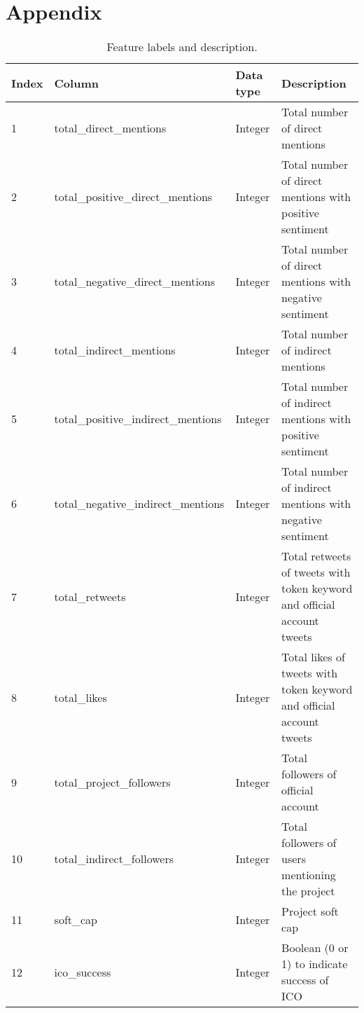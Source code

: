 \documentclass[runningheads]{llncs}
\begin{document}
\section{Appendix}
\begin{table*}[htbp]
\caption{Feature labels and description.}
\begin{center}
\begin{tabular}{|p{10mm}|p{46mm}|p{20mm}|p{50mm}|}
\hline
\textbf{Index} & \textbf{Column} & \textbf{Data type} & \textbf{Description} \\
\hline
1 & total\_direct\_mentions & Integer & Total number of direct mentions \\
\hline
2 & total\_positive\_direct\_mentions & Integer & Total number of direct mentions with positive sentiment \\
\hline
3 & total\_negative\_direct\_mentions & Integer & Total number of direct mentions with negative sentiment \\
\hline
4 & total\_indirect\_mentions & Integer & Total number of indirect mentions \\
\hline
5 & total\_positive\_indirect\_mentions & Integer & Total number of indirect mentions with positive sentiment \\
\hline
6 & total\_negative\_indirect\_mentions & Integer & Total number of indirect mentions with negative sentiment \\
\hline
7 & total\_retweets & Integer & Total retweets of tweets with token keyword and official account tweets \\
\hline
8 & total\_likes& Integer & Total likes of tweets with token keyword and official account tweets \\
\hline
9 & total\_project\_followers & Integer & Total followers of official account \\
\hline
10 & total\_indirect\_followers & Integer & Total followers of users mentioning the project \\
\hline
11 & soft\_cap & Integer & Project soft cap \\
\hline
12 & ico\_success & Integer & Boolean (0 or 1) to indicate success of ICO \\
\hline
\end{tabular}
\label{tab5}
\end{center}
\end{table*}
\end{document}
